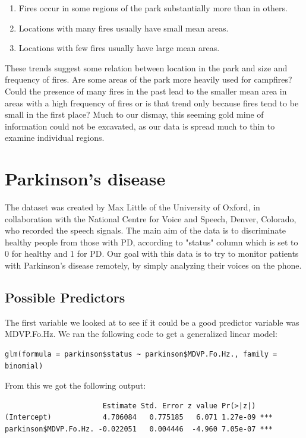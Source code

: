 \documentclass{article}
\begin{document}
\begin{enumerate}
	\item Fires occur in some regions of the park substantially more than in
    others.
	\item Locations with many fires usually have small mean areas.
	\item Locations with few fires usually have large mean areas.
\end{enumerate}

These trends suggest some relation between location in the park and size and
frequency of fires. Are some areas of the park more heavily used for campfires?
Could the presence of many fires in the past lead to the smaller mean area in
areas with a high frequency of fires or is that trend only because fires tend
to be small in the first place? Much to our dismay, this seeming gold mine of
information could not be excavated, as our data is spread much to thin to
examine individual regions.

\section{Parkinson's disease}

The dataset was created by Max Little of the University of Oxford, in
collaboration with the National Centre for Voice and Speech, Denver, Colorado,
who recorded the speech signals. The main aim of the data is to discriminate healthy
people from those with PD, according to "status" column which is set to 0 for
healthy and 1 for PD. Our goal with this data is to try to monitor patients with
Parkinson's disease remotely, by simply analyzing their voices on the phone.

\subsection{Possible Predictors}
The first variable we looked at to see if it could be a good predictor variable was
MDVP.Fo.Hz. We ran the following code to get a generalized linear model:

\begin{verbatim}
glm(formula = parkinson$status ~ parkinson$MDVP.Fo.Hz., family = binomial)
\end{verbatim}

From this we got the following output:

\begin{verbatim}
                       Estimate Std. Error z value Pr(>|z|)    
(Intercept)            4.706084   0.775185   6.071 1.27e-09 ***
parkinson$MDVP.Fo.Hz. -0.022051   0.004446  -4.960 7.05e-07 ***
\end{verbatim}
\end{document}
